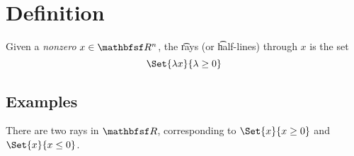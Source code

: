 
\section*{Definition}

Given a \textit{nonzero} $x \in \R ^n$, the \t{rays} (or \t{half-lines}) through $x$ is the set
\[
\Set{\lambda x}{\lambda  \geq 0}
\]

\subsection*{Examples}

There are two rays in $\R $, corresponding to $\Set{x}{x \geq 0}$ and $\Set{x}{x \leq 0}$.

\blankpage